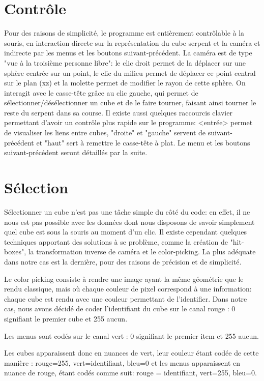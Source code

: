 \section{Contrôle}
Pour des raisons de simplicité, le programme est entièrement contrôlable à la souris, en interaction directe sur la représentation du cube serpent et la caméra et indirecte par les menus et les boutons suivant-précédent.
La caméra est de type "vue à la troisième personne libre": le clic droit permet de la déplacer sur une sphère centrée sur un point, le clic du milieu permet de déplacer ce point central sur le plan (xz) et la molette permet de modifier le rayon de cette sphère.
On interagit avec le casse-tête grâce au clic gauche, qui permet de sélectionner/désélectionner un cube et de le faire tourner, faisant ainsi tourner le reste du serpent dans sa course.
Il existe aussi quelques raccourcis clavier permettant d'avoir un contrôle plus rapide sur le programme: <entrée> permet de visualiser les liens entre cubes, "droite" et "gauche" servent de suivant-précédent et "haut" sert à remettre le casse-tête à plat.
Le menu et les boutons suivant-précédent seront détaillés par la suite.

\section{Sélection}

Sélectionner un cube n'est pas une tâche simple du côté du code: en effet, il ne nous est pas possible avec les données dont nous disposons de savoir simplement quel cube est sous la souris au moment d'un clic. Il existe cependant quelques techniques apportant des solutions à se problème, comme la création de "hit-boxes", la transformation inverse de caméra et le color-picking. La plus adéquate dans notre cas est la dernière, pour des raisons de précision et de simplicité.

Le color picking consiste à rendre une image ayant la même géométrie que le rendu classique, mais où chaque couleur de pixel correspond à une information: chaque cube est rendu avec une couleur permettant de l'identifier. Dans notre cas, nous avons décidé de coder l'identifiant du cube sur le canal rouge : 0 signifiant le premier cube et 255 aucun.

Les menus sont codés sur le canal vert : 0 signifiant le premier item et 255 aucun.

Les cubes apparaissent donc en nuances de vert, leur couleur étant codée de cette manière : rouge=255, vert=identifiant, bleu=0 et les menus apparaissent en nuance de rouge, étant codés comme suit: rouge = identifiant, vert=255, bleu=0.

